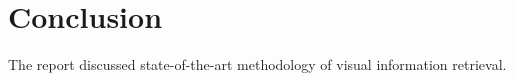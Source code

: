 \section{Conclusion}

The report discussed state-of-the-art methodology of visual information retrieval.
